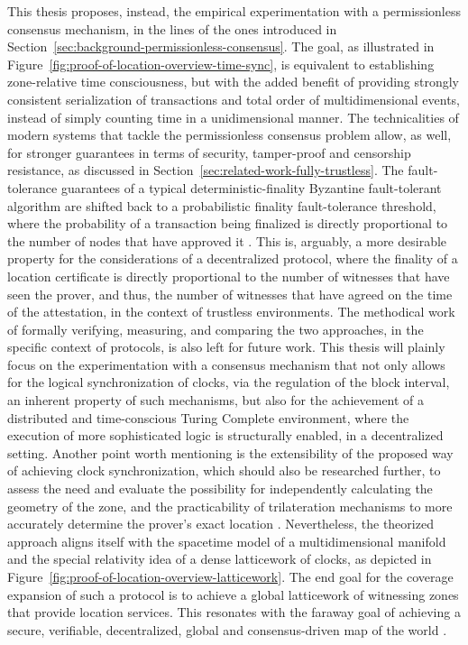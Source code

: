 This thesis proposes, instead, the empirical experimentation with a permissionless consensus mechanism, in the lines of the ones introduced in Section~\ref{sec:background-permissionless-consensus}. The goal, as illustrated in Figure~\ref{fig:proof-of-location-overview-time-sync}, is equivalent to establishing zone-relative time consciousness, but with the added benefit of providing strongly consistent serialization of transactions and total order of multidimensional events, instead of simply counting time in a unidimensional manner. The technicalities of modern systems that tackle the permissionless consensus problem allow, as well, for stronger guarantees in terms of security, tamper-proof and censorship resistance, as discussed in Section~\ref{sec:related-work-fully-trustless}. The fault-tolerance guarantees of a typical deterministic-finality Byzantine fault-tolerant algorithm are shifted back to a probabilistic finality fault-tolerance threshold, where the probability of a transaction being finalized is directly proportional to the number of nodes that have approved it \cite{survey-dist-consensus}. This is, arguably, a more desirable property for the considerations of a decentralized \pol{} protocol, where the finality of a location certificate is directly proportional to the number of witnesses that have seen the prover, and thus, the number of witnesses that have agreed on the time of the attestation, in the context of trustless environments. The methodical work of formally verifying, measuring, and comparing the two approaches, in the specific context of \pol{} protocols, is also left for future work. This thesis will plainly focus on the experimentation with a consensus mechanism that not only allows for the logical synchronization of clocks, via the regulation of the block interval, an inherent property of such mechanisms, but also for the achievement of a distributed and time-conscious Turing Complete environment, where the execution of more sophisticated logic is structurally enabled, in a decentralized setting. Another point worth mentioning is the extensibility of the proposed way of achieving clock synchronization, which should also be researched further, to assess the need and evaluate the possibility for independently calculating the geometry of the zone, and the practicability of trilateration mechanisms to more accurately determine the prover's exact location \cite{foam-white-paper}. Nevertheless, the theorized approach aligns itself with the spacetime model of a multidimensional manifold and the special relativity idea of a dense latticework of clocks, as depicted in Figure~\ref{fig:proof-of-location-overview-latticework}. The end goal for the coverage expansion of such a \pol{} protocol is to achieve a global latticework of witnessing zones that provide location services. This resonates with the faraway goal of achieving a secure, verifiable, decentralized, global and consensus-driven map of the world \cite{king_2020,foam-white-paper}.


